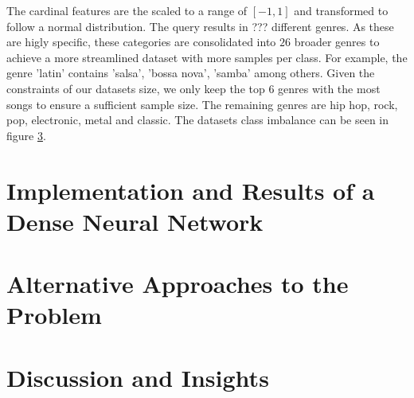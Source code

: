 \documentclass[
  12pt,
  bibliography=totoc,     %
  captions=tableheading,  %
  titlepage=firstiscover, %
]{scrartcl}
\begin{document}
\noindent
The cardinal features are the scaled to a range of $[-1,1]$ and transformed to follow a normal distribution.
The query results in ??? different genres. As these are higly specific, these categories are consolidated into $26$ broader genres to
achieve a more streamlined dataset with more samples per class. For example, the genre 'latin' contains 'salsa', 'bossa nova', 'samba' among others.
Given the constraints of our datasets size, we only keep the top $6$ genres with the most songs to ensure a sufficient sample
size. The remaining genres are hip hop, rock, pop, electronic, metal and classic. The datasets class imbalance can be seen in figure \ref{}.
\section{Implementation and Results of a Dense Neural Network}

\section{Alternative Approaches to the Problem}

\section{Discussion and Insights}

\printbibliography
\end{document}
